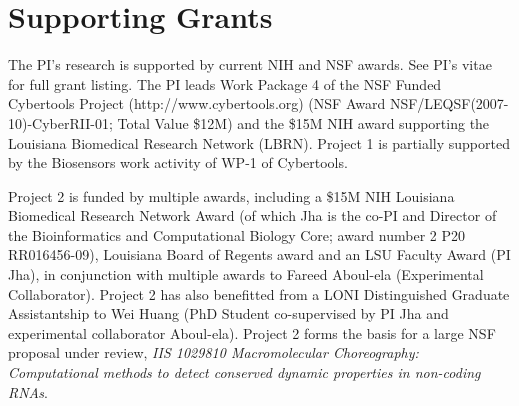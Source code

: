 \documentclass[a4paper,10pt]{article}
\newcommand{\up}{\vspace*{-1em}}
\begin{document}

\up\up
\section*{Supporting Grants}
\up

The PI's research is supported by current NIH and NSF awards.  See PI's vitae for full grant listing.
The PI leads Work Package 4 of the NSF Funded Cybertools Project (http://www.cybertools.org) (NSF Award NSF/LEQSF(2007-10)-CyberRII-01; Total Value \$12M) and the \$15M NIH award supporting the Louisiana Biomedical Research Network (LBRN). Project 1 is partially supported by the Biosensors work activity of WP-1 of Cybertools.

Project 2 is funded by multiple awards, including a \$15M NIH Louisiana Biomedical Research Network Award (of which Jha is the co-PI and Director of the Bioinformatics and Computational Biology Core; award number 2 P20 RR016456-09), Louisiana Board of Regents award and an LSU Faculty Award (PI Jha), in conjunction with multiple awards to Fareed Aboul-ela (Experimental Collaborator). Project 2 has also benefitted from a LONI Distinguished Graduate Assistantship to Wei Huang (PhD Student co-supervised by PI Jha and experimental collaborator Aboul-ela). Project 2 forms the basis for a large NSF proposal under review, {\it IIS 1029810 Macromolecular Choreography: Computational methods to detect conserved dynamic properties in non-coding RNAs}.
\end{document}
